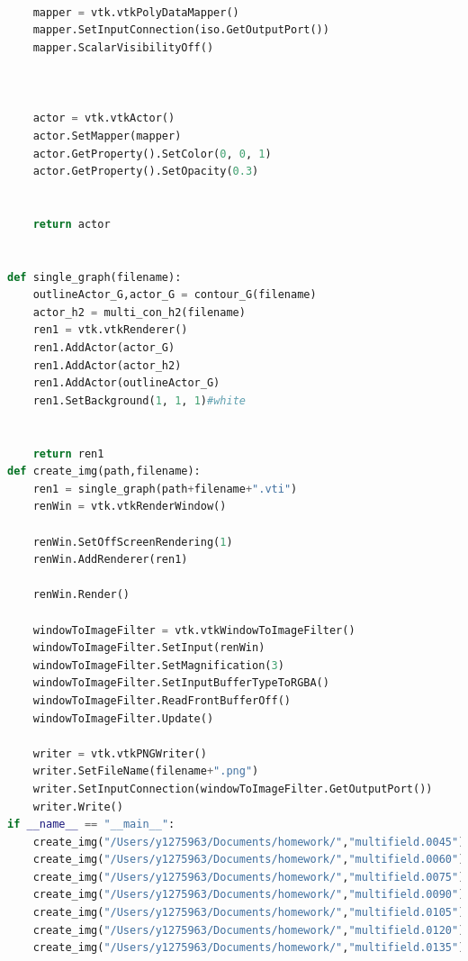 \documentclass[11pt]{scrartcl}
\begin{document}
\begin{lstlisting}[language=Python]
    
 
    
    mapper = vtk.vtkPolyDataMapper()
    mapper.SetInputConnection(iso.GetOutputPort())
    mapper.ScalarVisibilityOff()
    
 
    
    actor = vtk.vtkActor()
    actor.SetMapper(mapper)
    actor.GetProperty().SetColor(0, 0, 1)
    actor.GetProperty().SetOpacity(0.3)
    
 
    return actor

 
def single_graph(filename):
    outlineActor_G,actor_G = contour_G(filename)
    actor_h2 = multi_con_h2(filename)
    ren1 = vtk.vtkRenderer()
    ren1.AddActor(actor_G)
    ren1.AddActor(actor_h2)
    ren1.AddActor(outlineActor_G)
    ren1.SetBackground(1, 1, 1)#white
    
 
    return ren1
def create_img(path,filename):
    ren1 = single_graph(path+filename+".vti")
    renWin = vtk.vtkRenderWindow()
     
    renWin.SetOffScreenRendering(1)
    renWin.AddRenderer(ren1)

    renWin.Render()
    
    windowToImageFilter = vtk.vtkWindowToImageFilter()
    windowToImageFilter.SetInput(renWin)
    windowToImageFilter.SetMagnification(3)
    windowToImageFilter.SetInputBufferTypeToRGBA()
    windowToImageFilter.ReadFrontBufferOff()
    windowToImageFilter.Update()
    
    writer = vtk.vtkPNGWriter()
    writer.SetFileName(filename+".png")
    writer.SetInputConnection(windowToImageFilter.GetOutputPort())
    writer.Write()
if __name__ == "__main__":
    create_img("/Users/y1275963/Documents/homework/","multifield.0045")
    create_img("/Users/y1275963/Documents/homework/","multifield.0060")
    create_img("/Users/y1275963/Documents/homework/","multifield.0075")
    create_img("/Users/y1275963/Documents/homework/","multifield.0090")
    create_img("/Users/y1275963/Documents/homework/","multifield.0105")
    create_img("/Users/y1275963/Documents/homework/","multifield.0120")
    create_img("/Users/y1275963/Documents/homework/","multifield.0135")
\end{lstlisting}




\end{document}
